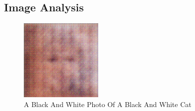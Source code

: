 \documentclass{article}%
\begin{document}
%
\subsection{Image Analysis}%
\label{subsec:ImageAnalysis}%


\begin{figure}[h!]%
\centering%
\includegraphics[width=150px]{500_fake_images/samples_5_72.png}%
\caption{A Black And White Photo Of A Black And White Cat}%
\end{figure}

%
\end{document}
